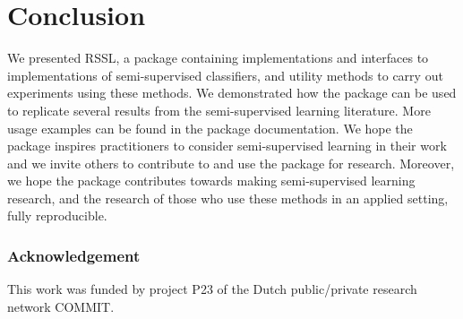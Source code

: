 \documentclass[runningheads,a4paper]{llncs}\usepackage[]{graphicx}\usepackage[]{color}
\begin{document}
\section{Conclusion}
We presented RSSL, a package containing implementations and interfaces to implementations of semi-supervised classifiers, and utility methods to carry out experiments using these methods. We demonstrated how the package can be used to replicate several results from the semi-supervised learning literature. More usage examples can be found in the package documentation. We hope the package inspires practitioners to consider semi-supervised learning in their work and we invite others to contribute to and use the package for research. Moreover, we hope the package contributes towards making semi-supervised learning research, and the research of those who use these methods in an applied setting, fully reproducible.

\subsubsection*{Acknowledgement}
This work was funded by project P23 of the Dutch public/private research network COMMIT.



\end{document}
